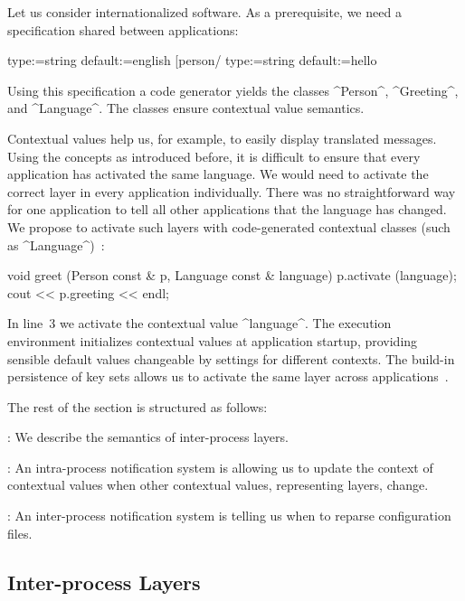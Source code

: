 \begin{example}
Let us consider internationalized software.
As a prerequisite, we need a specification shared between applications:

\begin{code}
[language]
  type:=string
  default:=english
[person/%
  type:=string
  default:=hello
\end{code}

Using this specification a code generator yields the classes ^Person^, ^Greeting^, and ^Language^.
The classes ensure contextual value semantics.

Contextual values help us, for example, to easily display translated messages.
Using the concepts as introduced before, it is difficult to ensure that every application has activated the same language.
We would need to activate the correct layer in every application individually.
There was no straightforward way for one application to tell all other applications that the language has changed.
We propose to activate such layers with code-generated contextual classes (such as ^Language^)~\cite{raab2016persistent}:

\begin{code}[language=Cpp]
void greet (Person const & p, Language const & language)
{
	p.activate (language);
	cout << p.greeting << endl;
}
\end{code}

In line~3 we activate the contextual value ^language^.
The execution environment initializes contextual values at application startup, providing sensible default values changeable by settings for different contexts.
The build-in persistence of key sets allows us to activate the same layer across applications~\cite{raab2016persistent}.
\end{example}

The rest of the section is structured as follows:

: We describe the semantics of inter-process layers.

: An intra-process notification system is allowing us to update the context of contextual values when other contextual values, representing layers, change.

: An inter-process notification system is telling us when to reparse configuration files.


\subsection{Inter-process Layers}
\label{sec:frontend-inter-process-layers}

